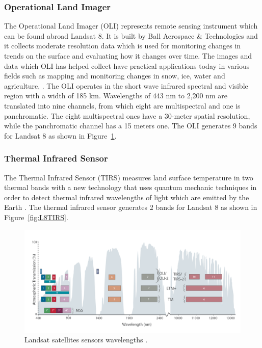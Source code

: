 \documentclass[12pt, a4paper]{report}
\begin{document}
	\subsubsection{Operational Land Imager}
	
	\par The Operational Land Imager (OLI) represents remote sensing instrument which can be found abroad Landsat 8. It is built by Ball Aerospace \& Technologies and it collects moderate resolution data which is used for monitoring changes in trends on the surface and evaluating how it changes over time. The images and data which OLI has helped collect have practical applications today in various fields such as mapping and monitoring changes in snow, ice, water and agriculture, \cite{KNIGHT2014}. 
	The OLI operates in the short wave infrared spectral and visible region with a width of 185 km. Wavelengths of 443 nm to 2,200 nm are translated into nine channels, from which  eight are multispectral and one is panchromatic. The eight multispectral ones have a 30-meter spatial resolution, while the panchromatic channel has a 15 meters one.
	The OLI generates 9 bands for Landsat 8 as shown in Figure~\ref{fig:L8OLI}.
	
	\subsubsection{Thermal Infrared Sensor}
	
	\par The Thermal Infrared Sensor (TIRS) measures land surface temperature in two thermal bands with a new technology that uses quantum mechanic techniques in order to detect thermal infrared wavelengths of light which are emitted by the Earth \cite{lgng}. The thermal infrared sensor generates 2 bands for Landsat 8 as shown in Figure~\ref{fig:L8TIRS}.
	
	\begin{figure}[h]
		\centering
		\includegraphics[scale=0.3]{../images/all_Landsat_bands.png}
		\caption{Landsat satellites sensors wavelengths \cite{olitris}.}
		\label{fig:L8OLI}
	\end{figure}
	
\end{document}
